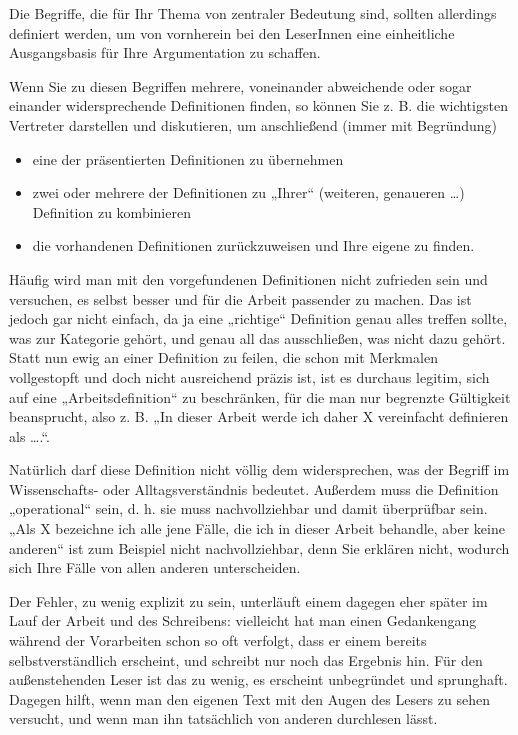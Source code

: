\documentclass[]{book}
\providecommand{\tightlist}{%
  \setlength{\itemsep}{0pt}\setlength{\parskip}{0pt}}
\theoremstyle{definition}
\theoremstyle{definition}
\theoremstyle{definition}
\theoremstyle{remark}
\begin{document}
Die Begriffe, die für Ihr Thema von zentraler Bedeutung sind, sollten
allerdings definiert werden, um von vornherein bei den LeserInnen eine
einheitliche Ausgangsbasis für Ihre Argumentation zu schaffen.

Wenn Sie zu diesen Begriffen mehrere, voneinander abweichende oder sogar
einander widersprechende Definitionen finden, so können Sie z. B. die
wichtigsten Vertreter darstellen und diskutieren, um anschließend (immer
mit Begründung)

\begin{itemize}
\tightlist
\item
  eine der präsentierten Definitionen zu übernehmen
\item
  zwei oder mehrere der Definitionen zu „Ihrer`` (weiteren, genaueren
  \ldots{}) Definition zu kombinieren
\item
  die vorhandenen Definitionen zurückzuweisen und Ihre eigene zu finden.
\end{itemize}

Häufig wird man mit den vorgefundenen Definitionen nicht zufrieden sein
und versuchen, es selbst besser und für die Arbeit passender zu machen.
Das ist jedoch gar nicht einfach, da ja eine „richtige`` Definition
genau alles treffen sollte, was zur Kategorie gehört, und genau all das
ausschließen, was nicht dazu gehört. Statt nun ewig an einer Definition
zu feilen, die schon mit Merkmalen vollgestopft und doch nicht
ausreichend präzis ist, ist es durchaus legitim, sich auf eine
„Arbeitsdefinition`` zu beschränken, für die man nur begrenzte
Gültigkeit beansprucht, also z. B. „In dieser Arbeit werde ich daher X
vereinfacht definieren als \ldots{}.``.

Natürlich darf diese Definition nicht völlig dem widersprechen, was der
Begriff im Wissenschafts- oder Alltagsverständnis bedeutet. Außerdem
muss die Definition „operational`` sein, d. h. sie muss nachvollziehbar
und damit überprüfbar sein. „Als X bezeichne ich alle jene Fälle, die
ich in dieser Arbeit behandle, aber keine anderen`` ist zum Beispiel
nicht nachvollziehbar, denn Sie erklären nicht, wodurch sich Ihre Fälle
von allen anderen unterscheiden.

Der Fehler, zu wenig explizit zu sein, unterläuft einem dagegen eher
später im Lauf der Arbeit und des Schreibens: vielleicht hat man einen
Gedankengang während der Vorarbeiten schon so oft verfolgt, dass er
einem bereits selbstverständlich erscheint, und schreibt nur noch das
Ergebnis hin. Für den außenstehenden Leser ist das zu wenig, es
erscheint unbegründet und sprunghaft. Dagegen hilft, wenn man den
eigenen Text mit den Augen des Lesers zu sehen versucht, und wenn man
ihn tatsächlich von anderen durchlesen lässt.
\end{document}
